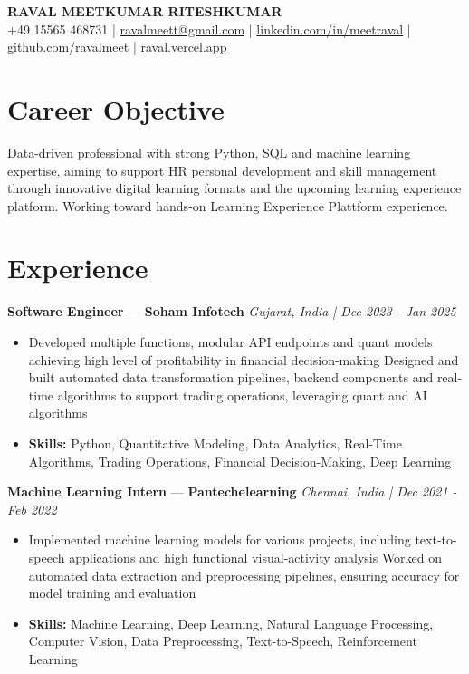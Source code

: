 \documentclass[a4paper,10pt]{article}
\begin{document}
\begin{center}
  {\Large\bfseries RAVAL MEETKUMAR RITESHKUMAR}\\[2pt]
  {\small +49 15565 468731 \;|\; \href{mailto:ravalmeett@gmail.com}{ravalmeett@gmail.com} \;|\; \href{https://www.linkedin.com/in/meetraval/}{linkedin.com/in/meetraval} \;|\; \href{https://github.com/ravalmeet}{github.com/ravalmeet} \;|\; \href{https://raval.vercel.app/}{raval.vercel.app}}
\end{center}
\vspace{-3pt}

\section*{Career Objective}
Data-driven professional with strong Python, SQL and machine learning expertise, aiming to support HR personal development and skill management through innovative digital learning formats and the upcoming learning experience platform. Working toward hands-on Learning Experience Plattform experience.\par

\section*{Experience}
\textbf{Software Engineer} — \textbf{Soham Infotech} \hfill \textit{Gujarat, India \;|\; Dec 2023 - Jan 2025}\par
\vspace{1pt}
\begin{itemize}
  \item Developed multiple functions, modular API endpoints and quant models achieving high level of profitability in financial decision-making Designed and built automated data transformation pipelines, backend components and real-time algorithms to support trading operations, leveraging quant and AI algorithms
  \item \textbf{Skills:} Python, Quantitative Modeling, Data Analytics, Real-Time Algorithms, Trading Operations, Financial Decision-Making, Deep Learning
\end{itemize}
\vspace{3pt}
\textbf{Machine Learning Intern} — \textbf{Pantechelearning} \hfill \textit{Chennai, India \;|\; Dec 2021 - Feb 2022}\par
\vspace{1pt}
\begin{itemize}
  \item Implemented machine learning models for various projects, including text-to-speech applications and high functional visual-activity analysis Worked on automated data extraction and preprocessing pipelines, ensuring accuracy for model training and evaluation
  \item \textbf{Skills:} Machine Learning, Deep Learning, Natural Language Processing, Computer Vision, Data Preprocessing, Text-to-Speech, Reinforcement Learning
\end{itemize}
\end{document}
